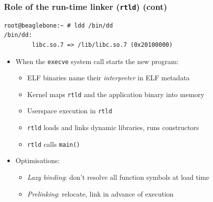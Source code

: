 \begin{frame}[fragile]
  \frametitle{Role of the run-time linker (\texttt{rtld}) (cont)}

  \begin{scriptsize}
\begin{verbatim}
root@beaglebone:~ # ldd /bin/dd
/bin/dd:
        libc.so.7 => /lib/libc.so.7 (0x20100000)
\end{verbatim}
  \end{scriptsize}

  \begin{itemize}
    \item When the \texttt{execve} system call starts the new program:
    \begin{itemize}
      \item ELF binaries name their \textit{interpreter} in ELF metadata
      \item Kernel maps \texttt{rtld} and the application binary into memory
      \item Userspace execution in \texttt{rtld}
      \item \texttt{rtld} loads and links dynamic libraries, runs constructors
      \item \texttt{rtld} calls \texttt{main()}
    \end{itemize}

    \medskip
    \pause

    \item Optimisations:
    \begin{itemize}
      \item \textit{Lazy binding}: don't resolve all function symbols at load
	time
      \item \textit{Prelinking}: relocate, link in advance of execution
    \end{itemize}
  \end{itemize}
\end{frame}

